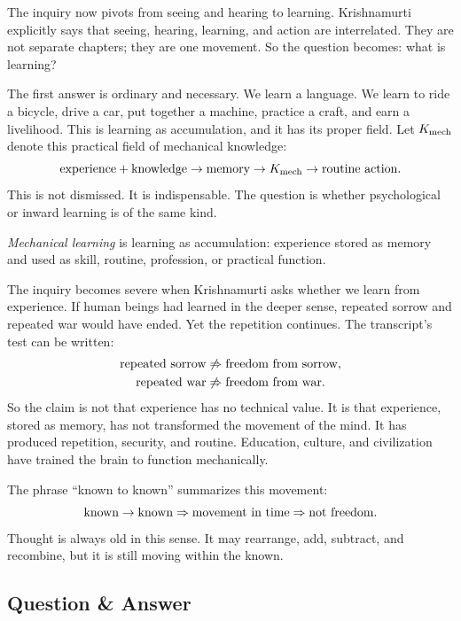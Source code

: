 The inquiry now pivots from seeing and hearing to learning. Krishnamurti explicitly says that seeing, hearing, learning, and action are interrelated. They are not separate chapters; they are one movement. So the question becomes: what is learning?

The first answer is ordinary and necessary. We learn a language. We learn to ride a bicycle, drive a car, put together a machine, practice a craft, and earn a livelihood. This is learning as accumulation, and it has its proper field. Let \(K_{\rm mech}\) denote this practical field of mechanical knowledge:
\begin{equation}
\hbox{experience}+\hbox{knowledge}
\to
\hbox{memory}
\to
K_{\rm mech}
\to
\hbox{routine action}.
\end{equation}
This is not dismissed. It is indispensable. The question is whether psychological or inward learning is of the same kind.

\begin{definition}
\emph{Mechanical learning} is learning as accumulation: experience stored as memory and used as skill, routine, profession, or practical function.
\end{definition}

The inquiry becomes severe when Krishnamurti asks whether we learn from experience. If human beings had learned in the deeper sense, repeated sorrow and repeated war would have ended. Yet the repetition continues. The transcript's test can be written:
\begin{align}
\hbox{repeated sorrow}
&\not\Rightarrow
\hbox{freedom from sorrow},\\
\hbox{repeated war}
&\not\Rightarrow
\hbox{freedom from war}.
\end{align}
So the claim is not that experience has no technical value. It is that experience, stored as memory, has not transformed the movement of the mind. It has produced repetition, security, and routine. Education, culture, and civilization have trained the brain to function mechanically.

The phrase ``known to known'' summarizes this movement:
\begin{equation}
\hbox{known}\to\hbox{known}
\Rightarrow
\hbox{movement in time}
\Rightarrow
\hbox{not freedom}.
\end{equation}
Thought is always old in this sense. It may rearrange, add, subtract, and recombine, but it is still moving within the known.

\subsection{Question \& Answer}

